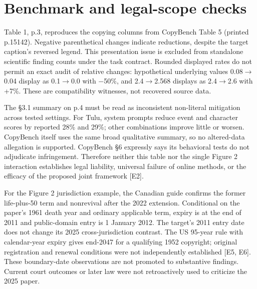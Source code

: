 \documentclass[10pt]{article}
\begin{document}
\section*{Benchmark and legal-scope checks}
Table 1, p.3, reproduces the copying columns from CopyBench Table 5 (printed p.15142). Negative parenthetical changes indicate reductions, despite the target caption’s reversed legend. This presentation issue is excluded from standalone scientific finding counts under the task contract. Rounded displayed rates do not permit an exact audit of relative changes: hypothetical underlying values 0.08\(\rightarrow\)0.04 display as 0.1\(\rightarrow\)0.0 with \(-\)50\%, and 2.4\(\rightarrow\)2.568 displays as 2.4\(\rightarrow\)2.6 with +7\%. These are compatibility witnesses, not recovered source data.\par
The §3.1 summary on p.4 must be read as inconsistent non-literal mitigation across tested settings. For Tulu, system prompts reduce event and character scores by reported 28\% and 29\%; other combinations improve little or worsen. CopyBench itself uses the same broad qualitative summary, so no altered-data allegation is supported. CopyBench §6 expressly says its behavioral tests do not adjudicate infringement. Therefore neither this table nor the single Figure 2 interaction establishes legal liability, universal failure of online methods, or the efficacy of the proposed joint framework [E2].\par
For the Figure 2 jurisdiction example, the Canadian guide confirms the former life-plus-50 term and nonrevival after the 2022 extension. Conditional on the paper’s 1961 death year and ordinary applicable term, expiry is at the end of 2011 and public-domain entry is 1 January 2012. The target’s 2011 entry date does not change its 2025 cross-jurisdiction contrast. The US 95-year rule with calendar-year expiry gives end-2047 for a qualifying 1952 copyright; original registration and renewal conditions were not independently established [E5, E6]. These boundary-date observations are not promoted to substantive findings. Current court outcomes or later law were not retroactively used to criticize the 2025 paper.\par
\end{document}
